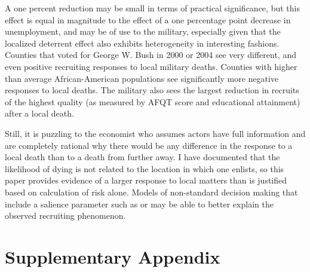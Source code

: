 \documentclass[12pt] {article}
\begin{document}
A one percent reduction may be small in terms of practical significance, but this effect is equal in magnitude to the effect of a one percentage point decrease in unemployment, and may be of use to the military, especially given that the localized deterrent effect also exhibits heterogeneity in interesting fashions. Counties that voted for George W. Bush in 2000 or 2004 see very different, and even positive recruiting responses
to local military deaths. Counties with higher than average African-American
populations see significantly more negative responses to local deaths. The military
also sees the largest reduction in recruits of the highest quality
(as measured by AFQT score and educational attainment) after a local
death. %

Still, it is puzzling to the economist who assumes actors have full
information and are completely rational why there would be any difference
in the response to a local death than to a death from further away.
I have documented that the likelihood of dying is not related to the
location in which one enlists, so this paper provides evidence of
a larger response to local matters than is justified based on calculation
of risk alone. Models of non-standard decision making that include
a salience parameter such as \cite{ChettySalience} or \cite{eBayEarly}
may be able to better explain the observed recruiting phenomenon. 







\newpage
\appendix

\section{Supplementary Appendix}
\setcounter{table}{0}
\renewcommand{\thetable}{A\arabic{table}}

\setcounter{figure}{0}
\renewcommand{\thefigure}{A\arabic{figure}}
\end{document}
